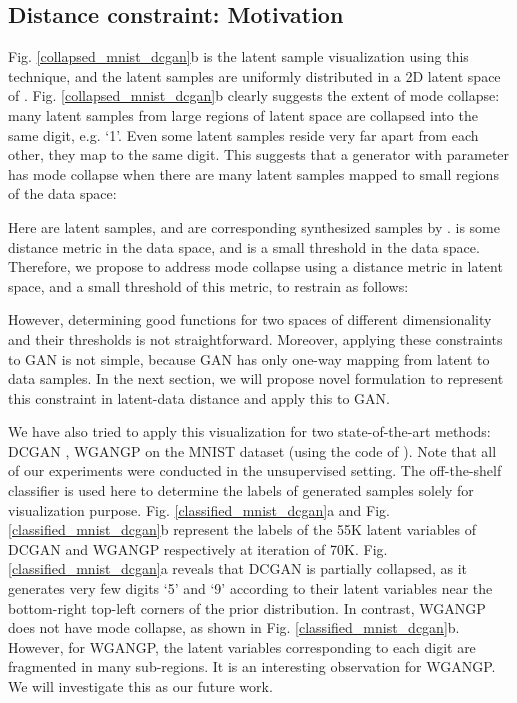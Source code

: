 \documentclass[runningheads]{llncs}
\newcommand*{\eg}{e.g. }
\begin{document}
\subsection{Distance constraint: Motivation}
Fig. \ref{collapsed_mnist_dcgan}b is the latent sample visualization using  this technique, and the latent samples are uniformly distributed in a 2D latent space of . 
Fig. \ref{collapsed_mnist_dcgan}b clearly suggests the extent of mode collapse: many latent samples  from large regions of latent space are collapsed into the same digit, \eg `1'.
Even some latent samples reside  very far apart from each other, they map to the same digit.
This suggests that  a generator  with parameter  has mode collapse when there are many latent samples mapped to small regions of the data space:

Here  are latent samples, and  are corresponding synthesized samples by .  is some distance metric in the data space, and  is a small threshold in the data space. Therefore, we propose to address mode collapse using a distance metric  in latent space, and a small threshold  of this metric, to restrain  as follows:

However, determining good functions  for two spaces of different dimensionality and their thresholds  is not straightforward. Moreover, applying these constraints to GAN is not simple, because GAN has only one-way mapping from latent to data samples. In the next section, we will propose novel formulation to represent this constraint in latent-data distance and apply this to GAN.

We have also tried to apply this visualization for two state-of-the-art methods: DCGAN \cite{radford-arxiv-2015}, WGANGP \cite{gulrajani-arxiv-2017} on the MNIST dataset (using the code of \cite{gulrajani-arxiv-2017}). Note that all of our experiments were conducted in the unsupervised setting. The off-the-shelf classifier is used here to determine the labels of generated samples solely for visualization purpose. Fig. \ref{classified_mnist_dcgan}a and Fig. \ref{classified_mnist_dcgan}b represent the labels of the 55K latent variables of DCGAN and WGANGP respectively at iteration of 70K.  Fig. \ref{classified_mnist_dcgan}a reveals that DCGAN is partially collapsed,  as it generates very few digits `5' and `9' according to their latent variables near the bottom-right top-left corners of the prior distribution. In contrast, WGANGP does not have mode collapse, as shown in Fig. \ref{classified_mnist_dcgan}b.  However, for WGANGP, the latent variables corresponding to  each digit are fragmented in many sub-regions. It is an interesting observation for WGANGP. We will investigate this as our future work.
\end{document}

